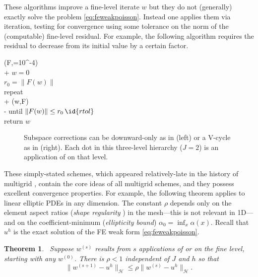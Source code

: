 \documentclass[letterpaper,final,12pt,reqno]{amsart}
\theoremstyle{claim}
\newtheorem{theorem}{Theorem}
\numberwithin{equation}{section}
\numberwithin{figure}{section}
\numberwithin{table}{section}
\numberwithin{theorem}{section}
\begin{document}
These  algorithms improve a fine-level iterate $w$ but they do not (generally) exactly solve the problem \eqref{eq:feweakpoisson}.  Instead one applies them via iteration, testing for convergence using some tolerance on the norm of the (computable) fine-level residual.  For example, the following algorithm requires the residual to decrease from its initial value by a certain factor.
\begin{pseudo*}
(F,=10^{-4})\text{:} \\+
    $w=0$ \qquad\qquad\qquad\qquad\qquad {} \\
    $r_0 = \|F(w)\|$ \\
    repeat \\+
        (w,F) \qquad\qquad {} \\-
    until $\|F(w)\| \le r_0\, \id{rtol}$ \\
    return $w$
\end{pseudo*}

\begin{figure}

\caption{Subspace corrections can be downward-only as in  (left) or a V-cycle as in  (right).  Each dot in this three-level hierarchy ($J=2$) is an application of  on that level.}
\label{fig:msdcycles}
\end{figure}

These simply-stated schemes, which appeared relatively-late in the history of multigrid \cite{Xu1992}, contain the core ideas of all multigrid schemes, and they possess excellent convergence properties.  For example, the following theorem applies to linear elliptic PDEs in any dimension.  The constant $\rho$ depends only on the element aspect ratios (\emph{shape regularity} \cite{Elmanetal2014}) in the mesh---this is not relevant in 1D---and on the coefficient-minimum (\emph{ellipticity bound}) $\alpha_0=\inf_x \alpha(x)$.  Recall that $u^h$ is the exact solution of the FE weak form \eqref{eq:feweakpoisson}.

\begin{theorem} \cite[Thm.~3.10]{GraeserKornhuber2009}\,  \label{thm:msdconvergence}  Suppose $w^{(s)}$  results from $s$ applications of  or  on the fine level, starting with any $w^{(0)}$.  There is $\rho<1$ independent of $J$ and $h$ so that
\begin{equation}
  \|w^{(s+1)} - u^h\|_{\mathcal{H}} \le \rho \|w^{(s)} - u^h\|_{\mathcal{H}}.  \label{eq:msdconvergence}
\end{equation}
\end{theorem}
\end{document}
